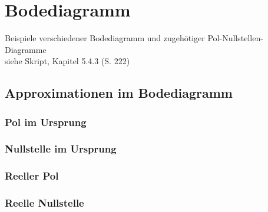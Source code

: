 \section{Bodediagramm}

Beispiele verschiedener Bodediagramm und zugehötiger Pol-Nullstellen-Diagramme \\
siehe Skript, Kapitel 5.4.3 (S. 222)


\subsection{Approximationen im Bodediagramm}

\begin{minipage}[t]{0.48\columnwidth}
    \subsubsection{Pol im Ursprung}

    

\end{minipage}
\hfill
\begin{minipage}[t]{0.48\columnwidth}
    \subsubsection{Nullstelle im Ursprung}

    

\end{minipage}


\begin{minipage}[t]{0.48\columnwidth}
    \subsubsection{Reeller Pol}

    

\end{minipage}
\hfill
\begin{minipage}[t]{0.48\columnwidth}
    \subsubsection{Reelle Nullstelle}

    

\end{minipage}



